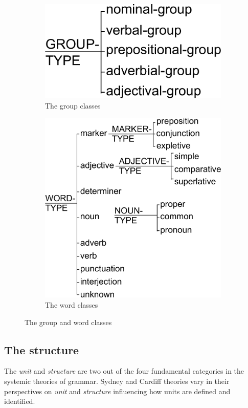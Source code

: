 \begin{figure}[H]
	\centering
	\begin{subfigure}{.5\textwidth}
		\centering
		\includegraphics[width=0.57\linewidth]{Figures/SFL-grammar/group-classes.pdf}
		\caption{The group classes}
		\label{fig:group-classes-sub1}
	\end{subfigure}%
	\begin{subfigure}{.5\textwidth}
		\centering
		\includegraphics[width=0.9\linewidth]{Figures/SFL-grammar/word-classes.pdf}
		\caption{The word classes}
		\label{fig:group-classes-sub2}
	\end{subfigure}
	\caption{The group and word classes}
	\label{fig:group-classes}
\end{figure}

\subsection{The structure}
The \textit{unit} and \textit{structure} are two out of the four fundamental categories in the systemic theories of grammar. Sydney and Cardiff theories vary in their perspectives on \textit{unit} and \textit{structure} influencing how units are defined and identified.

